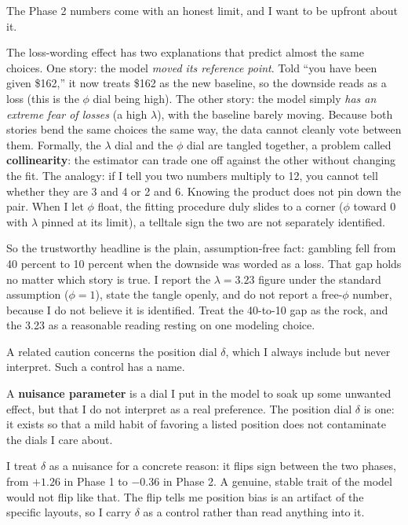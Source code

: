 \documentclass[11pt]{article}
\newcommand{\term}[1]{\textbf{\color{mossdk}#1}}
\begin{document}
The Phase 2 numbers come with an honest limit, and I want to be upfront about it.

\begin{asidebox}
The loss-wording effect has two explanations that predict almost the same choices. One story: the model
\emph{moved its reference point}. Told ``you have been given \$162,'' it now treats \$162 as the new
baseline, so the downside reads as a loss (this is the $\phi$ dial being high). The other story: the model
simply \emph{has an extreme fear of losses} (a high $\lambda$), with the baseline barely moving. Because
both stories bend the same choices the same way, the data cannot cleanly vote between them. Formally, the
$\lambda$ dial and the $\phi$ dial are tangled together, a problem called \term{collinearity}: the
estimator can trade one off against the other without changing the fit. The analogy: if I tell you two
numbers multiply to 12, you cannot tell whether they are 3 and 4 or 2 and 6. Knowing the product does not
pin down the pair. When I let $\phi$ float, the fitting procedure duly slides to a corner ($\phi$ toward 0
with $\lambda$ pinned at its limit), a telltale sign the two are not separately identified.

\smallskip
So the trustworthy headline is the plain, assumption-free fact: gambling fell from 40 percent to 10
percent when the downside was worded as a loss. That gap holds no matter which story is true. I report the
$\lambda = 3.23$ figure under the standard assumption ($\phi = 1$), state the tangle openly, and do not
report a free-$\phi$ number, because I do not believe it is identified. Treat the 40-to-10 gap as the
rock, and the 3.23 as a reasonable reading resting on one modeling choice.
\end{asidebox}

A related caution concerns the position dial $\delta$, which I always include but never interpret. Such a
control has a name.

\begin{defbox}
A \term{nuisance parameter} is a dial I put in the model to soak up some unwanted effect, but that I do
not interpret as a real preference. The position dial $\delta$ is one: it exists so that a mild habit of
favoring a listed position does not contaminate the dials I care about.
\end{defbox}

I treat $\delta$ as a nuisance for a concrete reason: it flips sign between the two phases, from $+1.26$ in
Phase 1 to $-0.36$ in Phase 2. A genuine, stable trait of the model would not flip like that. The flip
tells me position bias is an artifact of the specific layouts, so I carry $\delta$ as a control rather than
read anything into it.
\end{document}
